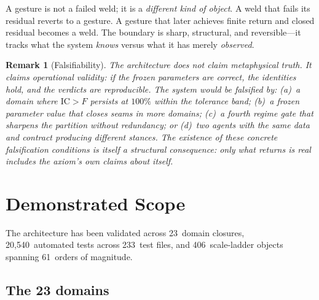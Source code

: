 \documentclass[
  aps,
  prd,
  twocolumn,
  superscriptaddress,
  nofootinbib,
  floatfix
]{revtex4-2}
\newtheorem{remark}{Remark}
\newcommand{\IC}{\mathrm{IC}}
\begin{document}
\noindent A gesture is not a failed weld; it is a
\emph{different kind of object}.  A weld that fails its residual
reverts to a gesture.  A gesture that later achieves finite return
and closed residual becomes a weld.  The boundary is sharp,
structural, and reversible---it tracks what the system \emph{knows}
versus what it has merely \emph{observed}.

\begin{remark}[Falsifiability]
The architecture does not claim metaphysical truth.  It claims
operational validity: if the frozen parameters are correct, the
identities hold, and the verdicts are reproducible.  The system
would be falsified by: (a)~a domain where $\IC > F$ persists at
$100\%$ within the tolerance band; (b)~a frozen parameter value
that closes seams in more domains; (c)~a fourth regime gate that
sharpens the partition without redundancy; or (d)~two agents with
the same data and contract producing different stances.  The
existence of these concrete falsification conditions is itself a
structural consequence: only what returns is real includes the
axiom's own claims about itself.
\end{remark}


\section{Demonstrated Scope}\label{sec:scope}

The architecture has been validated across 23~domain closures,
20{,}540~automated tests across 233~test files, and 406~scale-ladder
objects spanning 61~orders of magnitude.

\subsection{The 23 domains}
\end{document}
